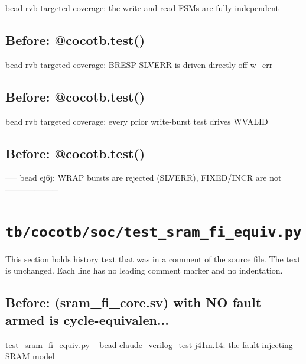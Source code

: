 \begin{record}
\begin{textblock}
bead rvb targeted coverage: the write and read FSMs are fully independent
\end{textblock}

\subsection*{Before: @cocotb.test()}

\begin{textblock}
bead rvb targeted coverage: BRESP-SLVERR is driven directly off w_err
\end{textblock}

\subsection*{Before: @cocotb.test()}

\begin{textblock}
bead rvb targeted coverage: every prior write-burst test drives WVALID
\end{textblock}

\subsection*{Before: @cocotb.test()}

\begin{textblock}
── bead ej6j: WRAP bursts are rejected (SLVERR), FIXED/INCR are not ─────────
\end{textblock}

\end{record}

\section{\texttt{tb/cocotb/soc/test\_sram\_fi\_equiv.py}}\label{cr:suite:soc-test-sram-fi-equiv}

This section holds history text that was in a comment of the source file. The text is unchanged. Each line has no leading comment marker and no indentation.

\begin{record}

\subsection*{Before: (sram\_fi\_core.sv) with NO fault armed is cycle-equivalen...}

\begin{textblock}
test_sram_fi_equiv.py -- bead claude_verilog_test-j41m.14: the fault-injecting SRAM model
\end{textblock}

\end{record}

